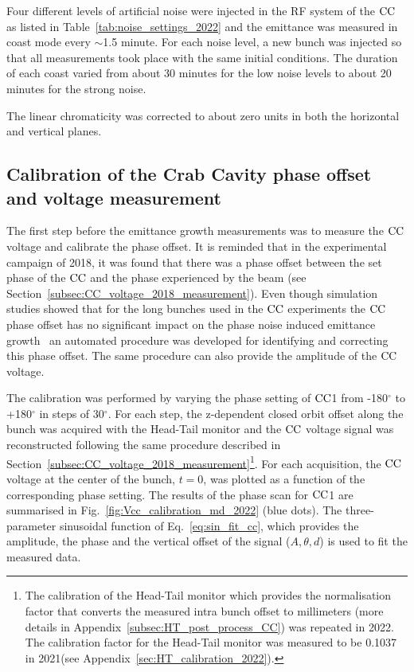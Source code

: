 Four different levels of artificial noise were injected in the RF system of the ${\mathrm{CC}}$ as listed in Table~\ref{tab:noise_settings_2022} and the emittance was measured in coast mode every $\sim$1.5 minute. For each noise level, a new bunch was injected so that all measurements took place with the same initial conditions. The duration of each coast varied from about 30 minutes for the low noise levels to about 20 minutes for the strong noise. 

The linear chromaticity was corrected to about zero units in both the horizontal and vertical planes. %

\subsection{Calibration of the Crab Cavity phase offset and voltage measurement}\label{subsec:cc_calibration_2022}

The first step before the emittance growth measurements was to measure the ${\mathrm{CC}}$ voltage and calibrate the phase offset. It is reminded that in the experimental campaign of 2018, it was found that there was a phase offset between the set phase of the ${\mathrm{CC}}$ and the phase experienced by the beam (see Section~\ref{subsec:CC_voltage_2018_measurement}). Even though simulation studies showed that for the long bunches used in the ${\mathrm{CC}}$ experiments the ${\mathrm{CC}}$ phase offset has no significant impact on the phase noise induced emittance growth~\cite{wp4_triantafyllou_2020} an automated procedure was developed for identifying and correcting this phase offset. The same procedure can also provide the amplitude of the ${\mathrm{CC}}$ voltage.

The calibration was performed by varying the phase setting of ${\mathrm{CC}}$1 from -180$^\circ$ to +180$^\circ$ in steps of 30$^\circ$. For each step, the z-dependent closed orbit offset along the bunch was acquired with the Head-Tail monitor and the ${\mathrm{CC}}$ voltage signal was reconstructed following the same procedure described in Section~\ref{subsec:CC_voltage_2018_measurement}\footnote{The calibration of the Head-Tail monitor which provides the normalisation factor that converts the measured intra bunch offset to millimeters (more details in Appendix~\ref{subsec:HT_post_process_CC}) was repeated in 2022. The calibration factor for the Head-Tail monitor was measured to be 0.1037 in 2021(see Appendix~\ref{sec:HT_calibration_2022}).}. For each acquisition, the ${\mathrm{CC}}$ voltage at the center of the bunch, $t=0$, was plotted as a function of the corresponding phase setting. The results of the phase scan for ${\mathrm{CC}}$1 are summarised in Fig.~\ref{fig:Vcc_calibration_md_2022} (blue dots). 
The three-parameter sinusoidal function of Eq.~\eqref{eq:sin_fit_cc}, which provides the amplitude, the phase and the vertical offset of the signal ($A, \theta, d$) is used to fit the measured data.

